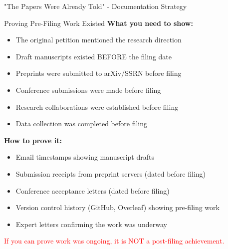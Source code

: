 \documentclass[11pt]{beamer}
\begin{document}
	\begin{frame}{"The Papers Were Already Told" - Documentation Strategy}
		\scriptsize
		\begin{block}{Proving Pre-Filing Work Existed}
			\textbf{What you need to show:}
			\begin{itemize}
				\item The original petition mentioned the research direction
				\item Draft manuscripts existed BEFORE the filing date
				\item Preprints were submitted to arXiv/SSRN before filing
				\item Conference submissions were made before filing
				\item Research collaborations were established before filing
				\item Data collection was completed before filing
			\end{itemize}
			\textbf{How to prove it:}
			\begin{itemize}
				\item Email timestamps showing manuscript drafts
				\item Submission receipts from preprint servers (dated before filing)
				\item Conference acceptance letters (dated before filing)
				\item Version control history (GitHub, Overleaf) showing pre-filing work
				\item Expert letters confirming the work was underway
			\end{itemize}
			\textcolor{red}{If you can prove work was ongoing, it is NOT a post-filing achievement.}
		\end{block}
	\end{frame}
	
\end{document}
